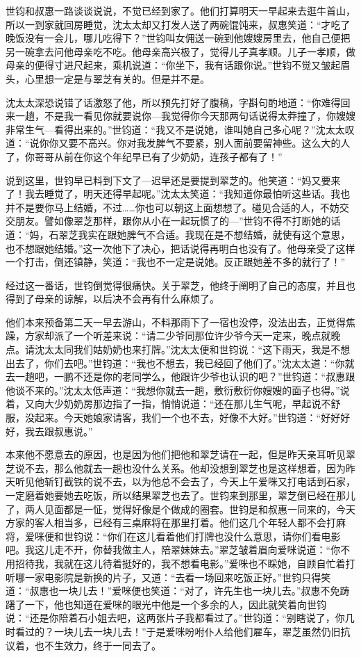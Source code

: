 \par 世钧和叔惠一路谈谈说说，不觉已经到家了。他们打算明天一早起来去逛牛首山，所以一到家就回房睡觉，沈太太却又打发人送了两碗馄饨来，叔惠笑道：“才吃了晚饭没有一会儿，哪儿吃得下？”世钧叫女佣送一碗到他嫂嫂房里去，他自己便把另一碗拿去问他母亲吃不吃。他母亲高兴极了，觉得儿子真孝顺。儿子一孝顺，做母亲的便得寸进尺起来，乘机说道：“你坐下，我有话跟你说。”世钧不觉又皱起眉头，心里想一定是与翠芝有关的。但是并不是。
\par 沈太太深恐说错了话激怒了他，所以预先打好了腹稿，字斟句酌地道：“你难得回来一趟，不是我一看见你就要说你—我觉得你今天那两句话说得太莽撞了，你嫂嫂非常生气—看得出来的。”世钧道：“我又不是说她，谁叫她自己多心呢？”沈太太叹道：“说你你又要不高兴。你对我发脾气不要紧，别人面前要留神些。这么大的人了，你哥哥从前在你这个年纪早已有了少奶奶，连孩子都有了！”
\par 说到这里，世钧早已料到下文了—迟早还是要提到翠芝的。他笑道：“妈又要来了！我去睡觉了，明天还得早起呢。”沈太太笑道：“我知道你最怕听这些话。我也并不是要你马上结婚，不过……你也可以朝这上面想想了。碰见合适的人，不妨交交朋友。譬如像翠芝那样，跟你从小在一起玩惯了的—”世钧不得不打断她的话道：“妈，石翠芝我实在跟她脾气不合适。我现在是不想结婚，就使有这个意思，也不想跟她结婚。”这一次他下了决心，把话说得再明白也没有了。他母亲受了这样一个打击，倒还镇静，笑道：“我也不一定是说她。反正跟她差不多的就行了！”
\par 经过这一番话，世钧倒觉得很痛快。关于翠芝，他终于阐明了自己的态度，并且也得到了母亲的谅解，以后决不会再有什么麻烦了。
\par 他们本来预备第二天一早去游山，不料那雨下了一宿也没停，没法出去，正觉得焦躁，方家却派了一个听差来说：“请二少爷同那位许少爷今天一定来，晚点就晚点。请沈太太同我们姑奶奶也来打牌。”沈太太便和世钧说：“这下雨天，我是不想出去了，你们去吧。”世钧道：“我也不想去，我已经回了他们了。”沈太太道：“你就去一趟吧，一鹏不还是你的老同学么，他跟许少爷也认识的吧？”世钧道：“叔惠跟他谈不来的。”沈太太低声道：“我想你就去一趟，敷衍敷衍你嫂嫂的面子也得。”说着，又向大少奶奶房那边指了一指，悄悄说道：“还在那儿生气呢，早起说不舒服，没起来。今天她娘家请客，我们一个也不去，好像不大好。”世钧道：“好好好好，我去跟叔惠说。”
\par 本来他不愿意去的原因，也是因为他们把他和翠芝请在一起，但是昨天亲耳听见翠芝说不去，那么他就去一趟也没什么关系。他却没想到翠芝也是这样想着，因为昨天听见他斩钉截铁的说不去，以为他总不会去了，今天上午爱咪又打电话到石家，一定磨着她要她去吃饭，所以结果翠芝也去了。世钧来到那里，翠芝倒已经在那儿了，两人见面都是一怔，觉得好像是个做成的圈套。世钧是和叔惠一同来的，今天方家的客人相当多，已经有三桌麻将在那里打着。他们这几个年轻人都不会打麻将，爱咪便和世钧说：“你们在这儿看着他们打牌也没什么意思，请你们看电影吧。我这儿走不开，你替我做主人，陪翠妹妹去。”翠芝皱着眉向爱咪说道：“你不用招待我，我就在这儿待着挺好的，我不想看电影。”爱咪也不睬她，自顾自忙着打听哪一家电影院是新换的片子，又道：“去看一场回来吃饭正好。”世钧只得笑道：“叔惠也一块儿去！”爱咪便也笑道：“对了，许先生也一块儿去。”叔惠不免踌躇了一下，他也知道在爱咪的眼光中他是一个多余的人，因此就笑着向世钧说：“还是你陪着石小姐去吧，这两张片子我都看过了。”世钧道：“别瞎说了，你几时看过的？一块儿去一块儿去！”于是爱咪吩咐仆人给他们雇车，翠芝虽然仍旧抗议着，也不生效力，终于一同去了。
